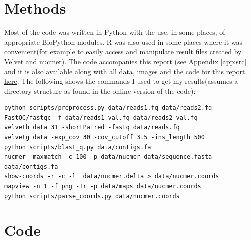 \documentclass[a4paper,12pt]{article}
\begin{document}
\section{Methods}
Most of the code was written in Python with the use, in some places,
of appropriate BioPython modules. R was also used in some places where
it was convenient(for example to easily access and manipulate result
files created by Velvet and nucmer). The code accompanies this report (see Appendix \ref{app:src} and it is also available along with all
data, images and the code for this report \href{http://people.ds.cam.ac.uk/az325/assembly/}{here}.
The following shows the commands I used to get my results(assumes a directory structure as found in the online version of the code):
\begin{verbatim}
python scripts/preprocess.py data/reads1.fq data/reads2.fq
FastQC/fastqc -f data/reads1_val.fq data/reads2_val.fq
velveth data 31 -shortPaired -fastq data/reads.fq
velvetg data -exp_cov 30 -cov_cutoff 3.5 -ins_length 500
python scripts/blast_q.py data/contigs.fa
nucmer -maxmatch -c 100 -p data/nucmer data/sequence.fasta data/contigs.fa
show-coords -r -c -l  data/nucmer.delta > data/nucmer.coords
mapview -n 1 -f png -Ir -p data/maps data/nucmer.coords
python scripts/parse_coords.py data/nucmer.coords
\end{verbatim}


\appendix
\label{app:src}
\section{Code}






\end{document}
